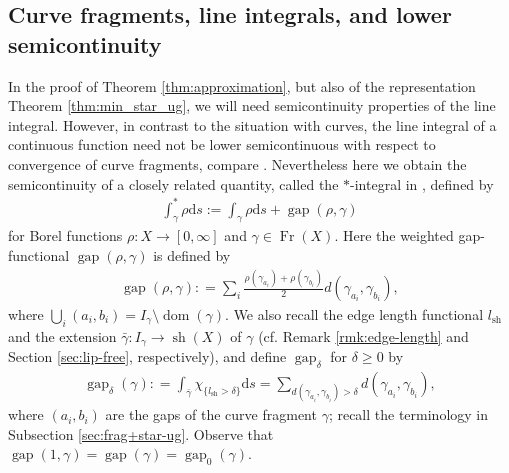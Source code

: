 \documentclass{amsart}
\numberwithin{equation}{section}
\newcommand{\gap}{\operatorname{gap}}
\newcommand{\dom}{\operatorname{dom}}
\newcommand{\Fr}{\operatorname{Fr}}
\newcommand{\sh}{\operatorname{sh}}
\newcommand{\ud}{\mathrm {d}}
\newcommand{\defl}{\mathrel{\mathop:}=}
\begin{document}
\subsection{Curve fragments, line integrals, and lower semicontinuity}\label{sec:line-integral_lsc}

In the proof of Theorem \ref{thm:approximation}, but also of the representation Theorem \ref{thm:min_star_ug}, we will need semicontinuity properties of the line integral. However, in contrast to the situation with curves, the line integral of a continuous function need not be lower semicontinuous with respect to convergence of curve fragments, compare \cite[Proposition 4]{keith03}. Nevertheless here we obtain the semicontinuity of a closely related quantity, called the $\ast$-integral in \cite{bate18}, defined by
\begin{align*}
    \int^\ast_\gamma\rho\ud s:=\int_\gamma\rho\ud s+\gap(\rho,\gamma)
\end{align*}
for Borel functions $\rho:X\to [0,\infty]$ and $\gamma\in \Fr(X)$. Here the weighted gap-functional $\gap(\rho,\gamma)$ is defined by
\begin{align*}
\gap(\rho,\gamma)\defl \sum_i\frac{\rho(\gamma_{a_i})+\rho(\gamma_{b_i})}{2}d(\gamma_{a_i},\gamma_{b_i}),
\end{align*}
where $\bigcup_i(a_i,b_i)=I_\gamma\setminus\dom(\gamma)$. We also recall the edge length functional $l_{\sh}$ and the extension $\bar\gamma:I_\gamma\to \sh(X)$ of $\gamma$ (cf. Remark \ref{rmk:edge-length} and Section \ref{sec:lip-free}, respectively), and define $\gap_\delta$ for $\delta\ge 0$ by
\begin{align*}
\gap_\delta(\gamma)\defl \int_{\bar\gamma}\chi_{\{l_{\sh}>\delta\}}\ud s=\sum_{d(\gamma_{a_i}, \gamma_{b_i})>\delta} d(\gamma_{a_i}, \gamma_{b_i}),
\end{align*}
where $(a_i,b_i)$ are the gaps of the curve fragment $\gamma$; recall the terminology in Subsection \ref{sec:frag+star-ug}. 
Observe that $\gap(1,\gamma)=\gap(\gamma)=\gap_0(\gamma)$. 
\end{document}
